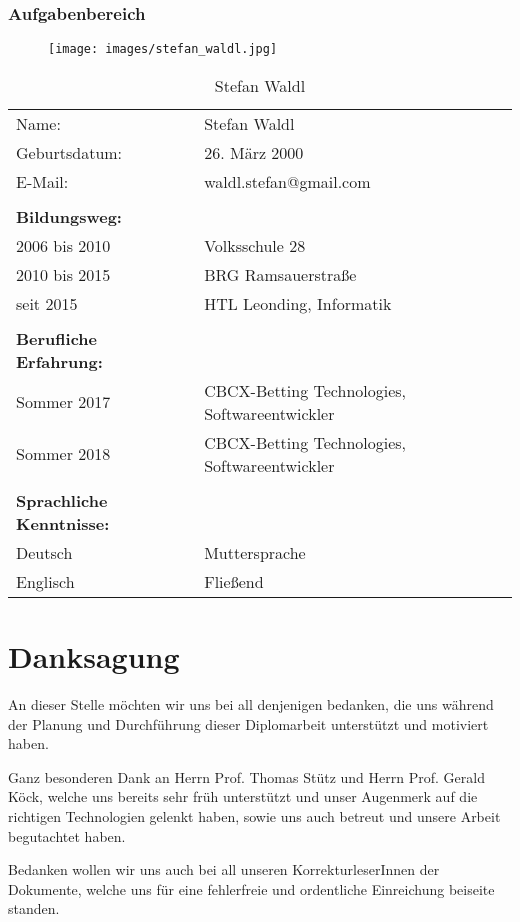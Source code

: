 \subsubsection*{Aufgabenbereich}
\begin{figure}[H]
	\texttt{[image: images/stefan\_waldl.jpg]}
\end{figure}
\begin{table}[htb]
\begin{tabular}{ll}
Name:                            & Stefan Waldl          		 \\
Geburtsdatum:                    & 26. März 2000                 \\
E-Mail:                          & waldl.stefan@gmail.com        \\
                                 &                               \\
\textbf{Bildungsweg:}            &                               \\  
2006 bis 2010                    & Volksschule 28      		     \\
2010 bis 2015                    & BRG Ramsauerstraße    	 	 \\
seit 2015                        & HTL Leonding, Informatik      \\
                                 &                               \\
\textbf{Berufliche Erfahrung:}   &                               \\
Sommer 2017                      & CBCX-Betting Technologies, Softwareentwickler \\
Sommer 2018                      & CBCX-Betting Technologies, Softwareentwickler \\
                                 &                               \\
\textbf{Sprachliche Kenntnisse:} &                               \\
Deutsch                          & Muttersprache                 \\
Englisch                         & Fließend                     
\end{tabular}
\caption{Stefan Waldl}
\end{table}
\pagebreak
 

\section*{Danksagung}

An dieser Stelle möchten wir uns bei all denjenigen bedanken, die uns während der
Planung und Durchführung dieser Diplomarbeit unterstützt und motiviert haben.

Ganz besonderen Dank an Herrn Prof. Thomas Stütz und Herrn Prof. Gerald Köck, welche uns bereits sehr früh unterstützt und unser Augenmerk auf die richtigen Technologien gelenkt haben, sowie uns auch betreut und unsere Arbeit begutachtet haben.

Bedanken wollen wir uns auch bei all unseren KorrekturleserInnen der Dokumente, welche
uns für eine fehlerfreie und ordentliche Einreichung beiseite standen.